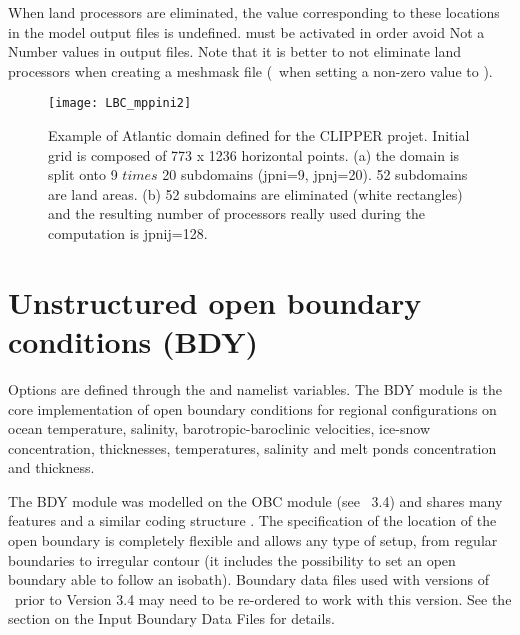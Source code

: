 \documentclass[../main/NEMO_manual]{subfiles}
\begin{document}
When land processors are eliminated, the value corresponding to these locations in the model output files is undefined.  must be activated in order avoid Not a Number values in output files. Note that it is better to not eliminate land processors when creating a meshmask file (\ie\ when setting a non-zero value to ).

\begin{figure}[!ht]
  \centering
  \texttt{[image: LBC\_mppini2]}
  \caption[Atlantic domain defined for the CLIPPER projet]{
    Example of Atlantic domain defined for the CLIPPER projet.
    Initial grid is composed of 773 x 1236 horizontal points.
    (a) the domain is split onto 9 $times$ 20 subdomains (jpni=9, jpnj=20).
    52 subdomains are land areas.
    (b) 52 subdomains are eliminated (white rectangles) and
    the resulting number of processors really used during the computation is jpnij=128.}
  \label{fig:LBC_mppini2}
\end{figure}

\section{Unstructured open boundary conditions (BDY)}
\label{sec:LBC_bdy}

\begin{listing}
  \caption{}
  \label{lst:nambdy}
\end{listing}

\begin{listing}
  \caption{}
  \label{lst:nambdy_dta}
\end{listing}

Options are defined through the  and  namelist variables.
The BDY module is the core implementation of open boundary conditions for regional configurations on
ocean temperature, salinity, barotropic-baroclinic velocities, ice-snow concentration, thicknesses, temperatures, salinity and melt ponds concentration and thickness.

The BDY module was modelled on the OBC module (see \NEMO\ 3.4) and shares many features and
a similar coding structure \citep{chanut_rpt05}.
The specification of the location of the open boundary is completely flexible and
allows any type of setup, from regular boundaries to irregular contour (it includes the possibility to set an open boundary able to follow an isobath).
Boundary data files used with versions of \NEMO\ prior to Version 3.4 may need to be re-ordered to work with this version.
See the section on the Input Boundary Data Files for details.
\end{document}

